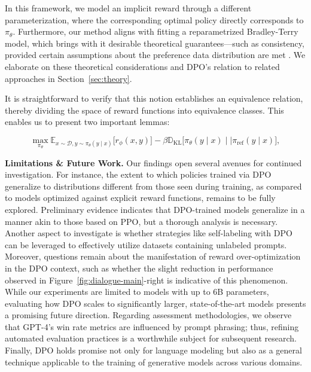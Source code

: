 In this framework, we model an implicit reward through a different parameterization, where the corresponding optimal policy directly corresponds to $\pi_\theta$. Furthermore, our method aligns with fitting a reparametrized Bradley-Terry model, which brings with it desirable theoretical guarantees—such as consistency, provided certain assumptions about the preference data distribution are met \cite{bong2022generalized}. We elaborate on these theoretical considerations and DPO's relation to related approaches in Section~\ref{sec:theory}.

It is straightforward to verify that this notion establishes an equivalence relation, thereby dividing the space of reward functions into equivalence classes. This enables us to present two important lemmas:

\label{sec:theory}

\begin{equation}\label{eq:RL}
\max_{\pi_{\theta}}  \mathbb{E}_{x\sim \mathcal{D}, y\sim \pi_{\theta}(y \mid x)}\bigl[r_{\phi}(x, y)\bigr] - \beta\mathbb{D}_{\textrm{KL}}\bigl[\pi_{\theta}(y\mid x)\mid \mid \pi_\text{ref}(y\mid x)\bigr],
\end{equation}

\textbf{Limitations \& Future Work.} Our findings open several avenues for continued investigation. For instance, the extent to which policies trained via DPO generalize to distributions different from those seen during training, as compared to models optimized against explicit reward functions, remains to be fully explored. Preliminary evidence indicates that DPO-trained models generalize in a manner akin to those based on PPO, but a thorough analysis is necessary. Another aspect to investigate is whether strategies like self-labeling with DPO can be leveraged to effectively utilize datasets containing unlabeled prompts. Moreover, questions remain about the manifestation of reward over-optimization in the DPO context, such as whether the slight reduction in performance observed in Figure~\ref{fig:dialogue-main}-right is indicative of this phenomenon. While our experiments are limited to models with up to 6B parameters, evaluating how DPO scales to significantly larger, state-of-the-art models presents a promising future direction. Regarding assessment methodologies, we observe that GPT-4's win rate metrics are influenced by prompt phrasing; thus, refining automated evaluation practices is a worthwhile subject for subsequent research. Finally, DPO holds promise not only for language modeling but also as a general technique applicable to the training of generative models across various domains.

